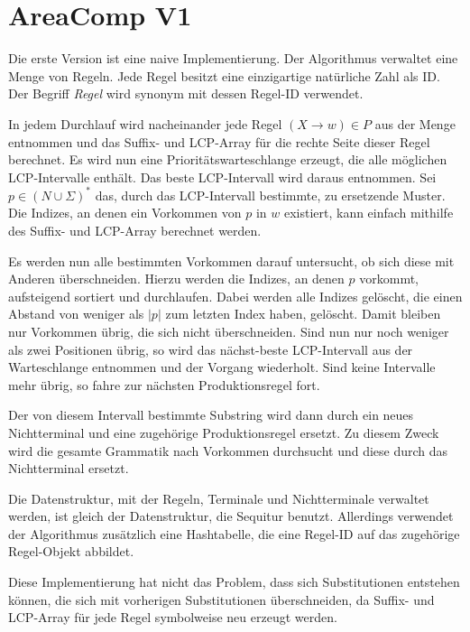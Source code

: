 \section{AreaComp V1}

Die erste Version ist eine naive Implementierung. Der Algorithmus verwaltet eine Menge von Regeln. Jede Regel besitzt eine einzigartige natürliche Zahl als ID. Der Begriff \emph{Regel} wird synonym mit dessen Regel-ID verwendet. 

In jedem Durchlauf wird nacheinander jede Regel $(X \rightarrow w) \in P$ aus der Menge entnommen und das Suffix- und LCP-Array für die rechte Seite dieser Regel berechnet. Es wird nun eine Prioritätswarteschlange erzeugt, die alle möglichen LCP-Intervalle enthält. Das beste LCP-Intervall wird daraus entnommen. Sei $p \in (N \cup \Sigma)^*$ das, durch das LCP-Intervall bestimmte, zu ersetzende Muster. Die Indizes, an denen ein Vorkommen von $p$ in $w$ existiert, kann einfach mithilfe des Suffix- und LCP-Array berechnet werden.

Es werden nun alle bestimmten Vorkommen darauf untersucht, ob sich diese mit Anderen überschneiden. Hierzu werden die Indizes, an denen $p$ vorkommt, aufsteigend sortiert und durchlaufen. Dabei werden alle Indizes gelöscht, die einen Abstand von weniger als $|p|$ zum letzten Index haben, gelöscht. Damit bleiben nur Vorkommen übrig, die sich nicht überschneiden. Sind nun nur noch weniger als zwei Positionen übrig, so wird das nächst-beste LCP-Intervall aus der Warteschlange entnommen und der Vorgang wiederholt. Sind keine Intervalle mehr übrig, so fahre zur nächsten Produktionsregel fort.

Der von diesem Intervall bestimmte Substring wird dann durch ein neues Nichtterminal und eine zugehörige Produktionsregel ersetzt. Zu diesem Zweck wird die gesamte Grammatik nach Vorkommen durchsucht und diese durch das Nichtterminal ersetzt.

Die Datenstruktur, mit der Regeln, Terminale und Nichtterminale verwaltet werden, ist gleich der Datenstruktur, die Sequitur benutzt. Allerdings verwendet der Algorithmus zusätzlich eine Hashtabelle, die eine Regel-ID auf das zugehörige Regel-Objekt abbildet.

Diese Implementierung hat nicht das Problem, dass sich Substitutionen entstehen können, die sich mit vorherigen Substitutionen überschneiden, da Suffix- und LCP-Array für jede Regel symbolweise neu erzeugt werden. 

